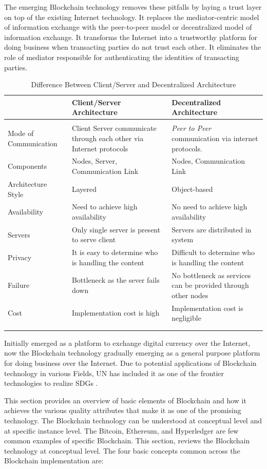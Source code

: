 \documentclass[10pt]{IETBook}
\begin{document}
The emerging Blockchain technology removes these pitfalls by laying a trust layer on top of the existing Internet technology. It replaces the mediator-centric model of information exchange with the peer-to-peer model or decentralized model of information exchange. It transforms the Internet into a trustworthy platform for doing business when transacting parties do not trust each other. It eliminates the role of mediator responsible for authenticating the identities of transacting parties.

\begin{longtable}{p{2.6cm}p{4cm}p{4cm}}
	\\ \hline
	~ & Client/Server Architecture & Decentralized Architecture \\ \hline \\
	Mode of Communication & Client Server communicate through each other via Internet protocols & {\em Peer to Peer} communication via internet protocols. \\
	Components & Nodes, Server, Communication Link & Nodes, Communication Link \\
	Architecture Style & Layered & Object-based \\
	Availability & Need to achieve high availability & No need to achieve high availability \\
	Servers & Only single server is present to serve client & Servers are distributed in system \\
	Privacy & It is easy to determine who is handling the content & Difficult to determine who is handling the content \\
	Failure & Bottleneck as the sever fails down & No bottleneck as services can be provided through other nodes \\
	Cost & Implementation cost is high & Implementation cost is negligible \\ \hline
	\\
	\caption{Difference Between Client/Server and Decentralized Architecture}
\end{longtable}

Initially emerged as a platform to exchange digital currency over the Internet, now the Blockchain technology gradually emerging as a general purpose platform for doing business over the Internet. Due to potential applications of Blockchain technology in various Fields, UN has included it as one of the frontier technologies to realize SDGs \cite{ftech}. 

This section provides an overview of basic elements of Blockchain and how it achieves the various quality attributes that make it as one of the promising technology. The Blockchain technology can be understood at conceptual level and at specific instance level. The Bitcoin, Ethereum, and Hyperledger are few common examples of specific Blockchain. This section, reviews the Blockchain technology at conceptual level. The four basic concepts common across the Blockchain implementation are: \cite{dinh2018}
\end{document}

